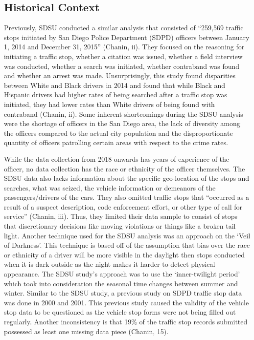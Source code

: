 \documentclass[11pt]{article}
\begin{document}
    \subsection{Historical Context}\label{historical-context}

    Previously, SDSU conducted a similar analysis that consisted of
``259,569 traffic stops initiated by San Diego Police Department (SDPD)
officers between January 1, 2014 and December 31, 2015'' (Chanin, ii).
They focused on the reasoning for initiating a traffic stop, whether a
citation was issued, whether a field interview was conducted, whether a
search was initiated, whether contraband was found and whether an arrest
was made. Unsurprisingly, this study found disparities between White and
Black drivers in 2014 and found that while Black and Hispanic drivers
had higher rates of being searched after a traffic stop was initiated,
they had lower rates than White drivers of being found with contraband
(Chanin, ii). Some inherent shortcomings during the SDSU analysis were
the shortage of officers in the San Diego area, the lack of diversity
among the officers compared to the actual city population and the
disproportionate quantity of officers patrolling certain areas with
respect to the crime rates.

    While the data collection from 2018 onwards has years of experience of
the officer, no data collection has the race or ethnicity of the officer
themselves. The SDSU data also lacks information about the specific
geo-location of the stops and searches, what was seized, the vehicle
information or demeanors of the passengers/drivers of the cars. They
also omitted traffic stops that ``occurred as a result of a suspect
description, code enforcement effort, or other type of call for
service'' (Chanin, iii). Thus, they limited their data sample to consist
of stops that discretionary decisions like moving violations or things
like a broken tail light. Another technique used for the SDSU analysis
was an approach on the `Veil of Darkness'. This technique is based off
of the assumption that bias over the race or ethnicity of a driver will
be more visible in the daylight then stops conducted when it is dark
outside as the night makes it harder to detect physical appearance. The
SDSU study's approach was to use the `inner-twilight period' which took
into consideration the seasonal time changes between summer and winter.
Similar to the SDSU study, a previous study on SDPD traffic stop data
was done in 2000 and 2001. This previous study caused the validity of
the vehicle stop data to be questioned as the vehicle stop forms were
not being filled out regularly. Another inconsistency is that 19\% of
the traffic stop records submitted possessed as least one missing data
piece (Chanin, 15).
\end{document}
